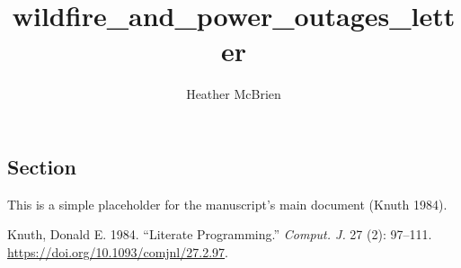 \documentclass[
  letterpaper,
  DIV=11,
  numbers=noendperiod]{scrartcl}
\title{wildfire\_and\_power\_outages\_letter}
\author{Heather McBrien}
\date{}
\newlength{\cslhangindent}
\newenvironment{CSLReferences}[2] %
 {\begin{list}{}{%
  \setlength{\itemindent}{0pt}
  \setlength{\leftmargin}{0pt}
  \setlength{\parsep}{0pt}
  \ifodd #1
   \setlength{\leftmargin}{\cslhangindent}
   \setlength{\itemindent}{-1\cslhangindent}
  \fi
  \setlength{\itemsep}{#2\baselineskip}}}
 {\end{list}}
\begin{document}
\maketitle


\subsection{Section}\label{section}

This is a simple placeholder for the manuscript's main document (Knuth
1984).

\label{refs}
\begin{CSLReferences}{1}{0}
Knuth, Donald E. 1984. {``Literate Programming.''} \emph{Comput. J.} 27
(2): 97--111. \url{https://doi.org/10.1093/comjnl/27.2.97}.

\end{CSLReferences}
\end{document}
